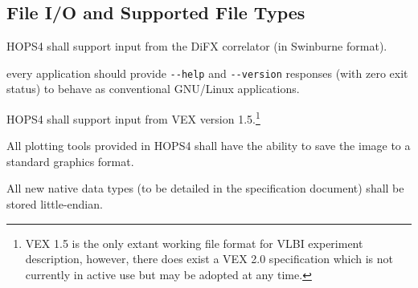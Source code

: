 
\subsection{File I/O and Supported File Types}
\label{sec:ioreq}

\begin{description}

 HOPS4 shall support input from the DiFX \cite{deller2007difx,deller2011difx} correlator (in Swinburne format).

 every application should provide
    \verb+--help+ and \verb+--version+ responses (with zero exit status)
    to behave as conventional \acs{GNU/Linux} applications.

 HOPS4 shall support input from \acs{VEX} version 1.5.\footnote{\acs{VEX} 1.5
is the only extant working file format for VLBI experiment description, however, there does
exist a VEX 2.0 specification which is not currently in active use but may be adopted at any time.}


 All plotting tools provided in HOPS4 shall have the ability to save the image to
a standard graphics format.


 All new native data types (to be detailed in the specification document)
shall be stored \acs{little-endian}.


\end{description}
